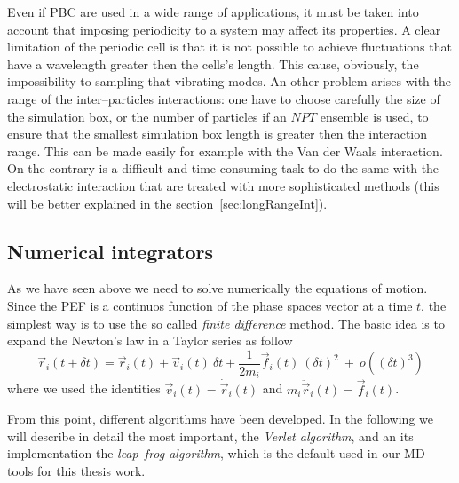 Even if \ac{PBC} are used in a wide range of applications, it must be taken into account that imposing periodicity to a system may affect its properties. A clear limitation of the periodic cell is that it is not possible to achieve fluctuations that have a wavelength greater then the cells's length. This cause, obviously, the impossibility to sampling that vibrating modes. An other problem arises with the range of the inter--particles interactions: one have to choose carefully the size of the simulation box, or the number of particles if an $NPT$ ensemble is used, to ensure that the smallest simulation box length is greater then the interaction range. This can be made easily for example with the Van der Waals interaction. On the contrary is a difficult and time consuming task to do the same with the electrostatic interaction that are treated with more sophisticated methods (this will be better explained in the section~\ref{sec:longRangeInt}).

\subsection{Numerical integrators}
As we have seen above we need to solve numerically the equations of motion. Since the \ac{PEF} is a continuos function of the phase spaces vector at a time $t$, the simplest way is to use the so called \textit{finite difference} method. The basic idea is to expand the Newton's law in a Taylor series as follow
\begin{equation}
	\vec r_i(t + \delta t) = \vec r_i(t) + \vec v_i(t)\ \delta t + \frac{1}{2m_i}\vec f_i(t)\ (\delta t)^2\ +\ o((\delta t)^3)
	\label{eq:newtonTaylor}
\end{equation}
where we used the identities $\vec v_i(t) = \dot{\vec r}_i(t)$ and $m_i\ddot{\vec r}_i(t) = \vec f_i(t)$.

From this point, different algorithms have been developed. In the following we will describe in detail the most important, the \textit{Verlet algorithm}, and an its implementation the \textit{leap--frog algorithm}, which is the default used in our \ac{MD} tools for this thesis work.

